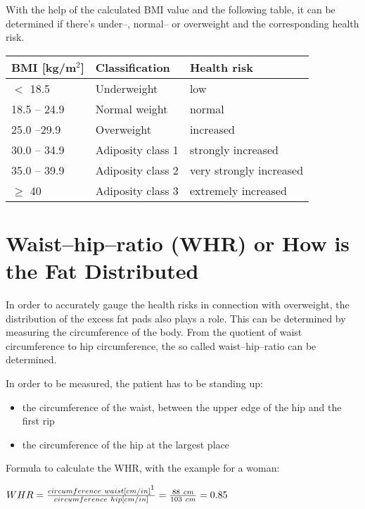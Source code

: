 \documentclass[../main.tex]{subfiles}
\begin{document}
With the help of the calculated BMI value and the following table, it can be determined if there's under--, normal-- or overweight and the corresponding health risk.

\begin{table}[htb!]
  \centering
  \begin{tabular}{lll}
    \textbf{BMI [kg/m$^2$]} & \textbf{Classification} & \textbf{Health risk} \\
    \hline
    $<$ 18.5 & Underweight & low \\
    18.5 -- 24.9 & Normal weight & normal \\
    25.0 --29.9 & Overweight & increased \\
    30.0 -- 34.9 & Adiposity class 1 & strongly increased \\
    35.0 -- 39.9 & Adiposity class 2 & very strongly increased \\
    $\geq$ 40 & Adiposity class 3 & extremely  increased \\
  \end{tabular}
\end{table}

\section[Waist--hip--ratio (WHR)]{Waist--hip--ratio (WHR) or How is the Fat Distributed}
In order to accurately gauge the health risks in connection with overweight, the distribution of the excess fat pads also plays a role.
This can be determined by measuring the circumference of the body.
From the quotient of waist circumference to hip circumference, the so called waist--hip--ratio can be determined.


In order to be measured, the patient has to be standing up:
\begin{itemize}
\item the circumference of the waist, between the upper edge of the hip and the first rip
  \item the circumference of the hip at the largest place
  \end{itemize}

  Formula to calculate the WHR, with the example for a woman:

  \vspace{2mm}

\begin{center}
\begin{fminipage}{8cm}
$WHR = \frac{circumference\ waist [cm/in]\footnote{As the WHR is a ratio of measures, it doesn't matter in which unit the circumferences are measured, as long as it's in the same units for both of them.}}{circumference\ hip [cm/in]} = \frac{88\ cm}{103\ cm} = 0.85$
\end{fminipage}
\end{center}
\end{document}
